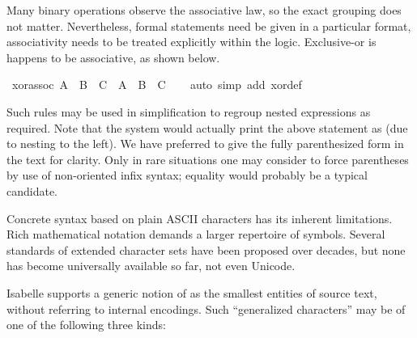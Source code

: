\begin{isabellebody}
\begin{isamarkuptext}
  Many binary operations observe the associative law, so the exact
  grouping does not matter.  Nevertheless, formal statements need be
  given in a particular format, associativity needs to be treated
  explicitly within the logic.  Exclusive-or is happens to be
  associative, as shown below.%
\end{isamarkuptext}%
\isamarkuptrue%
\ xor{\isacharunderscore}assoc{\isacharcolon}\ {\isachardoublequote}{\isacharparenleft}A\ {\isacharbrackleft}{\isacharplus}{\isacharbrackright}\ B{\isacharparenright}\ {\isacharbrackleft}{\isacharplus}{\isacharbrackright}\ C\ {\isacharequal}\ A\ {\isacharbrackleft}{\isacharplus}{\isacharbrackright}\ {\isacharparenleft}B\ {\isacharbrackleft}{\isacharplus}{\isacharbrackright}\ C{\isacharparenright}{\isachardoublequote}\isanewline
\ \ \isamarkupfalse%
\ {\isacharparenleft}auto\ simp\ add{\isacharcolon}\ xor{\isacharunderscore}def{\isacharparenright}\isamarkupfalse%
%
\begin{isamarkuptext}%
Such rules may be used in simplification to regroup nested
  expressions as required.  Note that the system would actually print
  the above statement as 
  (due to nesting to the left).  We have preferred to give the fully
  parenthesized form in the text for clarity.  Only in rare situations
  one may consider to force parentheses by use of non-oriented infix
  syntax; equality would probably be a typical candidate.%
\end{isamarkuptext}%
\isamarkuptrue%
%
\isamarkuptrue%
%
\begin{isamarkuptext}%
Concrete syntax based on plain ASCII characters has its inherent
  limitations.  Rich mathematical notation demands a larger repertoire
  of symbols.  Several standards of extended character sets have been
  proposed over decades, but none has become universally available so
  far, not even Unicode.

  Isabelle supports a generic notion of  as the
  smallest entities of source text, without referring to internal
  encodings.  Such ``generalized characters'' may be of one of the
  following three kinds:


\end{isamarkuptext}
\end{isabellebody}
